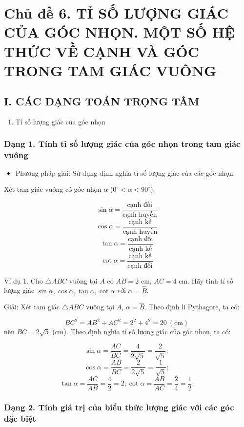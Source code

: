 \documentclass[%
    fontsize=12pt,%
    chapterprefix=false,%
    open=right,%
    twoside=false,%
    numbers=noenddot,%
    headings=optiontohead,%
    final,%
    DIV=15,%
    parskip=half %
]{scrbook}
\begin{document}
\section{Chủ đề 6. TỈ SỐ LƯỢNG GIÁC CỦA GÓC NHỌN. MỘT SỐ HỆ THỨC VỀ CẠNH VÀ GÓC TRONG TAM GIÁC VUÔNG}
\subsection{I. CÁC DẠNG TOÁN TRỌNG TÂM}

\begin{enumerate}
  \item Tỉ số lượng giác của góc nhọn
\end{enumerate}
\subsubsection{Dạng 1. Tính tỉ số lượng giác của góc nhọn trong tam giác vuông}

\begin{itemize}
  \item Phương pháp giải: Sử dụng định nghĩa tỉ số lượng giác của các góc nhọn.
\end{itemize}

Xét tam giác vuông có góc nhọn $ \alpha $ ($0^\circ < \alpha < 90^\circ$):

\[
\sin \alpha = \frac{\text{cạnh đối}}{\text{cạnh huyền}}
\]
\[
\cos \alpha = \frac{\text{cạnh kề}}{\text{cạnh huyền}}
\]
\[
\tan \alpha = \frac{\text{cạnh đối}}{\text{cạnh kề}}
\]
\[
\cot \alpha = \frac{\text{cạnh kề}}{\text{cạnh đối}}
\]

Ví dụ 1. Cho $ \triangle ABC $ vuông tại $ A $ có $ AB = 2 $ cm, $ AC = 4 $ cm. Hãy tính tỉ số lượng giác $ \sin \alpha, \cos \alpha, \tan \alpha, \cot \alpha $ với $ \alpha = \widehat{B} $.

Giải: Xét tam giác $ \triangle ABC $ vuông tại $ A $, $ \alpha = \widehat{B} $. Theo định lí Pythagore, ta có:

\[
BC^2 = AB^2 + AC^2 = 2^2 + 4^2 = 20 \ (\text{cm})
\]
nên $ BC = 2\sqrt{5} $ (cm). Theo định nghĩa tỉ số lượng giác của góc nhọn, ta có:

\[
\sin \alpha = \frac{AC}{BC} = \frac{4}{2\sqrt{5}} = \frac{2}{\sqrt{5}};
\]
\[
\cos \alpha = \frac{AB}{BC} = \frac{2}{2\sqrt{5}} = \frac{1}{\sqrt{5}};
\]
\[
\tan \alpha = \frac{AC}{AB} = \frac{4}{2} = 2; \cot \alpha = \frac{AB}{AC} = \frac{2}{4} = \frac{1}{2}.
\]

\subsubsection{Dạng 2. Tính giá trị của biểu thức lượng giác với các góc đặc biệt}
\end{document}
